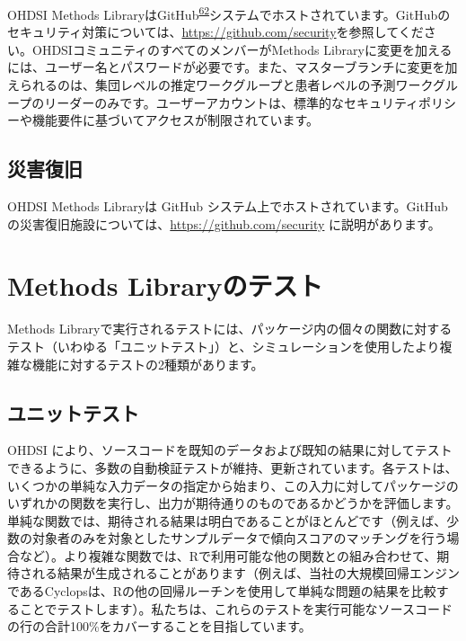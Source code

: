 \documentclass[
  11pt]{book}
\theoremstyle{definition}
\theoremstyle{definition}
\theoremstyle{definition}
\theoremstyle{definition}
\theoremstyle{remark}
\begin{document}
OHDSI Methods LibraryはGitHub\textsuperscript{\href{https://ohdsi.github.io/TheBookOfOhdsi/SoftwareValidity.html\#fn62}{62}}システムでホストされています。GitHubのセキュリティ対策については、\url{https://github.com/security}を参照してください。OHDSIコミュニティのすべてのメンバーがMethods Libraryに変更を加えるには、ユーザー名とパスワードが必要です。また、マスターブランチに変更を加えられるのは、集団レベルの推定ワークグループと患者レベルの予測ワークグループのリーダーのみです。ユーザーアカウントは、標準的なセキュリティポリシーや機能要件に基づいてアクセスが制限されています。

\subsection{災害復旧}\label{ux707dux5bb3ux5fa9ux65e7}

OHDSI Methods Libraryは GitHub システム上でホストされています。GitHub の災害復旧施設については、\url{https://github.com/security} に説明があります。

\section{Methods Libraryのテスト}\label{methods-libraryux306eux30c6ux30b9ux30c8}

Methods Libraryで実行されるテストには、パッケージ内の個々の関数に対するテスト（いわゆる「ユニットテスト」）と、シミュレーションを使用したより複雑な機能に対するテストの2種類があります。

\subsection{ユニットテスト}\label{ux30e6ux30cbux30c3ux30c8ux30c6ux30b9ux30c8}

OHDSI により、ソースコードを既知のデータおよび既知の結果に対してテストできるように、多数の自動検証テストが維持、更新されています。各テストは、いくつかの単純な入力データの指定から始まり、この入力に対してパッケージのいずれかの関数を実行し、出力が期待通りのものであるかどうかを評価します。単純な関数では、期待される結果は明白であることがほとんどです（例えば、少数の対象者のみを対象としたサンプルデータで傾向スコアのマッチングを行う場合など）。より複雑な関数では、Rで利用可能な他の関数との組み合わせて、期待される結果が生成されることがあります（例えば、当社の大規模回帰エンジンであるCyclopsは、Rの他の回帰ルーチンを使用して単純な問題の結果を比較することでテストします）。私たちは、これらのテストを実行可能なソースコードの行の合計100\%をカバーすることを目指しています。
\end{document}
